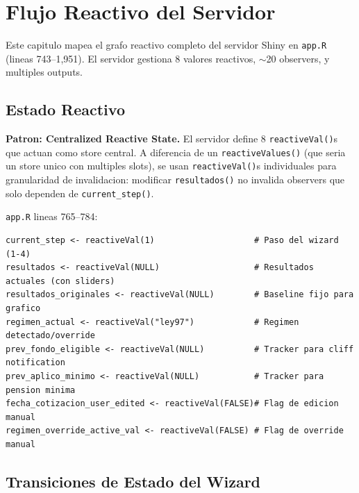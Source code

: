 \documentclass[11pt, letterpaper, twoside]{report}
\begin{document}
\chapter{Flujo Reactivo del Servidor}
\label{ch:server}

Este capitulo mapea el grafo reactivo completo del servidor Shiny en \texttt{app.R}
(lineas 743--1,951). El servidor gestiona 8 valores reactivos, $\sim$20 observers,
y multiples outputs.

\section{Estado Reactivo}
\label{sec:estado}

\begin{patronbox}
\textbf{Patron: Centralized Reactive State.} El servidor define 8
\texttt{reactiveVal()}s que actuan como store central. A diferencia de un
\texttt{reactiveValues()} (que seria un store unico con multiples slots), se
usan \texttt{reactiveVal()}s individuales para granularidad de invalidacion:
modificar \texttt{resultados()} no invalida observers que solo dependen de
\texttt{current\_step()}.
\end{patronbox}

\begin{codigobox}
\texttt{app.R} lineas 765--784:
\begin{lstlisting}[caption={Los 8 reactiveVals del servidor}]
current_step <- reactiveVal(1)                    # Paso del wizard (1-4)
resultados <- reactiveVal(NULL)                   # Resultados actuales (con sliders)
resultados_originales <- reactiveVal(NULL)        # Baseline fijo para grafico
regimen_actual <- reactiveVal("ley97")            # Regimen detectado/override
prev_fondo_eligible <- reactiveVal(NULL)          # Tracker para cliff notification
prev_aplico_minimo <- reactiveVal(NULL)           # Tracker para pension minima
fecha_cotizacion_user_edited <- reactiveVal(FALSE)# Flag de edicion manual
regimen_override_active_val <- reactiveVal(FALSE) # Flag de override manual
\end{lstlisting}
\end{codigobox}


\section{Transiciones de Estado del Wizard}
\end{document}
